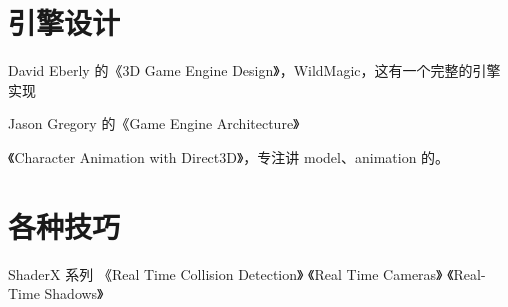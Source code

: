 \documentclass[UTF8,a4paper,12pt]{ctexbook}
\begin{document}
	\section{引擎设计}		
		David Eberly 的《3D Game Engine Design》，WildMagic，这有一个完整的引擎实现
		
		Jason Gregory 的《Game Engine Architecture》
		
		《Character Animation with Direct3D》，专注讲 model、animation 的。
		
	\section{各种技巧}
		ShaderX 系列
		《Real Time Collision Detection》
		《Real Time Cameras》
		《Real-Time Shadows》

	  
\end{document}
